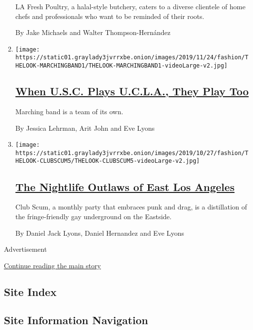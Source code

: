 \begin{enumerate}
  LA Fresh Poultry, a halal-style butchery, caters to a diverse
  clientele of home chefs and professionals who want to be reminded of
  their roots.

  By Jake Michaels and Walter Thompson-Hernández
\item
  \texttt{[image: https://static01.graylady3jvrrxbe.onion/images/2019/11/24/fashion/THELOOK-MARCHINGBAND1/THELOOK-MARCHINGBAND1-videoLarge-v2.jpg]}

  \hypertarget{when-usc-plays-ucla-they-play-too}{%
  \subsection{\texorpdfstring{\href{/2019/11/23/style/usc-ucla-marching-band.html}{When
  U.S.C. Plays U.C.L.A., They Play
  Too}}{When U.S.C. Plays U.C.L.A., They Play Too}}\label{when-usc-plays-ucla-they-play-too}}

  Marching band is a team of its own.

  By Jessica Lehrman, Arit John and Eve Lyons
\item
  \texttt{[image: https://static01.graylady3jvrrxbe.onion/images/2019/10/27/fashion/THELOOK-CLUBSCUM5/THELOOK-CLUBSCUM5-videoLarge-v2.jpg]}

  \hypertarget{the-nightlife-outlaws-of-east-los-angeles}{%
  \subsection{\texorpdfstring{\href{/2019/10/19/style/the-nightlife-outlaws-of-east-los-angeles.html}{The
  Nightlife Outlaws of East Los
  Angeles}}{The Nightlife Outlaws of East Los Angeles}}\label{the-nightlife-outlaws-of-east-los-angeles}}

  Club Scum, a monthly party that embraces punk and drag, is a
  distillation of the fringe-friendly gay underground on the Eastside.

  By Daniel Jack Lyons, Daniel Hernandez and Eve Lyons
\end{enumerate}

Advertisement

\protect\hyperlink{after-mid6}{Continue reading the main story}

\hypertarget{site-index}{%
\subsection{Site Index}\label{site-index}}

\hypertarget{site-information-navigation}{%
\subsection{Site Information
Navigation}\label{site-information-navigation}}

